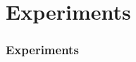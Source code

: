 \section{Experiments} %


\begin{frame}
    \frametitle{Experiments}
    \begin{center}

    \end{center}
\end{frame}